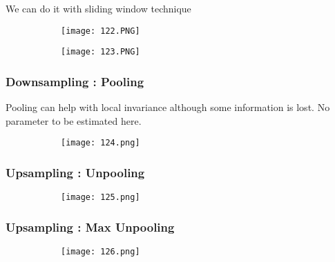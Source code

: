 \documentclass{article}
\begin{document}
We can do it with sliding window technique

\begin{figure}[ht!]
  \centering
  \begin{subfigure}[b]{0.5\linewidth}
    \texttt{[image: 122.PNG]}
  \end{subfigure}
     \begin{subfigure}[b]{0.49\textwidth}
         \centering
         \texttt{[image: 123.PNG]}
     \end{subfigure}
\end{figure}

\subsubsection{Downsampling : Pooling}

Pooling can help with local invariance although some information is lost. No parameter to be estimated here.


\begin{figure}[ht!]
  \centering
  \begin{subfigure}[b]{0.5\linewidth}
    \texttt{[image: 124.png]}
  \end{subfigure}
\end{figure}

\vspace{30mm}

\subsubsection{Upsampling : Unpooling}

\begin{figure}[ht!]
  \centering
  \begin{subfigure}[b]{0.7\linewidth}
    \texttt{[image: 125.png]}
  \end{subfigure}
\end{figure}

\subsubsection{Upsampling : Max Unpooling}

\begin{figure}[ht!]
  \centering
  \begin{subfigure}[b]{0.7\linewidth}
    \texttt{[image: 126.png]}
  \end{subfigure}
\end{figure}
\end{document}
